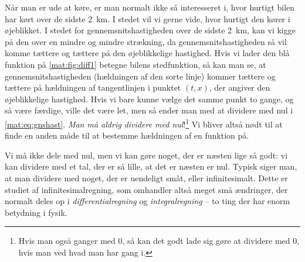 Når man er ude at køre, er man normalt ikke så interesseret i, hvor hurtigt bilen har kørt over de sidste \SI{2}{km}. I stedet vil vi gerne vide, hvor hurtigt den kører i øjeblikket. I stedet for gennemsnitshastigheden over de sidste \SI{2}{km}, kan vi kigge på den over en mindre og mindre strækning, da gennemsnitshastigheden så vil komme tættere og tættere på den øjeblikkelige hastighed. Hvis vi lader den blå funktion på \cref{mat:fig:diff1} betegne bilens stedfunktion, så kan man se, at gennemsnitshastigheden (hældningen af den sorte linje) kommer tættere og tættere på hældningen af tangentlinjen i punktet $(t,x)$, der angiver den øjeblikkelige hastighed.  
Hvis vi bare kunne vælge det samme punkt to gange, og så være færdige, ville det være let, men så ender man med at dividere med nul i \cref{mat:eq:gnshast}. \emph{Man må aldrig dividere med nul}!\footnote{Hvis man også ganger med 0, så kan det godt lade sig gøre at dividere med 0, hvis man ved hvad man har gang i.} Vi bliver altså nødt til at finde en anden måde til at bestemme hældningen af en funktion på. 

Vi må ikke dele med nul, men vi kan gøre noget, der er næsten lige så godt: vi kan dividere med et tal, der er så lille, at det er næsten er nul. Typisk siger man, at man dividere med noget, der er uendeligt småt, eller infinitesimalt. Dette er studiet af infinitesimalregning, som omhandler altså meget små ændringer, der normalt deles op i \emph{differentialregning} og \emph{integralregning} -- to ting der har enorm betydning i fysik.

